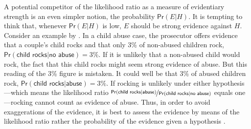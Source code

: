 \documentclass{article}
\newcommand{\pr}{\mathsf{Pr}}
\begin{document}
A potential competitor of the likelihood ratio as a measure of evidentiary strength is an even simpler notion, the probability $\pr(E \vert H)$. It is tempting to think that, whenever $\pr(E \vert H)$ is low, 
$E$ should be strong evidence against 
$H$. 
Consider an example by \cite{robertson2016interpreting}. In a child abuse case, the prosecutor offers evidence that a couple's child rocks and that only 3\% of non-abused children rock, $\pr(\textsf{child rocks} \vert \textsf{no abuse})=3\%$. If it is unlikely that a non-abused child would rock, the fact that this child rocks might seem strong evidence of abuse. But this reading of the 3\% figure is mistaken. It could well be that 
3\% of abused children rock, $\pr(\textsf{child rocks} \vert \textsf{abuse})=3\%$. 
If rocking is unlikely under either hypothesis---which means the likelihood ratio 
 $\nicefrac{\pr(\textsf{child rocks} \vert \textsf{abuse})}{\pr(\textsf{child rocks} \vert \textsf{no abuse})}$ equals one---rocking cannot count as evidence of abuse. Thus, in order to avoid exaggerations of the evidence, it is best to assess the evidence by means of the likelihood ratio rather the probability of the evidence given a hypothesis  \citep{Royall1997, triggsCommentWhyEffecta, enfs2015}. 
\end{document}
